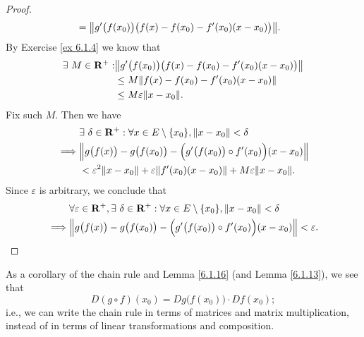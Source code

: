 \begin{proof}
\begin{align*}
         & = \norm*{g'\big(f(x_0)\big) \big(f(x) - f(x_0) - f'(x_0) (x - x_0)\big)}.
    \end{align*}
    By Exercise \ref{ex 6.1.4} we know that
    \begin{align*}
        \exists\ M \in \mathbf{R}^+ : & \norm*{g'\big(f(x_0)\big) \big(f(x) - f(x_0) - f'(x_0) (x - x_0)\big)} \\
                                      & \leq M \norm*{f(x) - f(x_0) - f'(x_0) (x - x_0)}                       \\
                                      & \leq M \varepsilon \norm*{x - x_0}.
    \end{align*}
    Fix such \(M\).
    Then we have
    \begin{align*}
                 & \exists\ \delta \in \mathbf{R}^+ : \forall x \in E \setminus \{x_0\}, \norm*{x - x_0} < \delta          \\
        \implies & \norm*{g\big(f(x)\big) - g\big(f(x_0)\big) - \Big(g'\big(f(x_0)\big) \circ f'(x_0)\Big) (x - x_0)}      \\
                 & < \varepsilon^2 \norm*{x - x_0} + \varepsilon \norm*{f'(x_0)(x - x_0)} + M \varepsilon \norm*{x - x_0}.
    \end{align*}
    Since \(\varepsilon\) is arbitrary, we conclude that
    \begin{align*}
                 & \forall \varepsilon \in \mathbf{R}^+, \exists\ \delta \in \mathbf{R}^+ : \forall x \in E \setminus \{x_0\}, \norm*{x - x_0} < \delta \\
        \implies & \norm*{g\big(f(x)\big) - g\big(f(x_0)\big) - \Big(g'\big(f(x_0)\big) \circ f'(x_0)\Big) (x - x_0)} < \varepsilon.
    \end{align*}
\end{proof}

\begin{note}
    As a corollary of the chain rule and Lemma \ref{6.1.16} (and Lemma \ref{6.1.13}), we see that
    \[
        D (g \circ f)(x_0) = D g\big(f(x_0)\big) \cdot D f(x_0);
    \]
    i.e., we can write the chain rule in terms of matrices and matrix multiplication, instead of in terms of linear transformations and composition.
\end{note}

